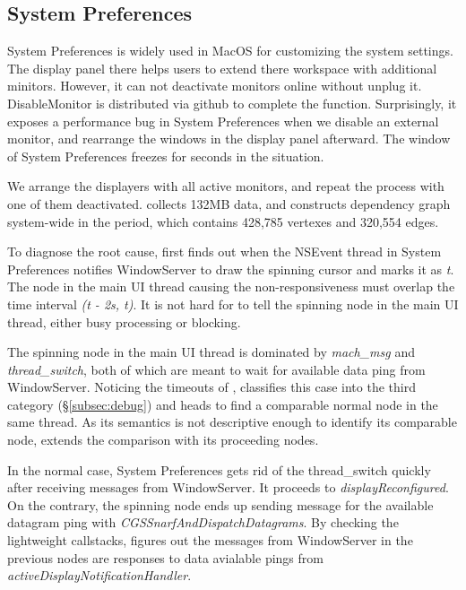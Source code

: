 \subsection{System Preferences}

System Preferences is widely used in MacOS for customizing the system settings.
The display panel there helps users to extend there workspace with additional
minitors. However, it can not deactivate monitors online without unplug it.
DisableMonitor is distributed via github to complete the function. Surprisingly,
it exposes a performance bug in System Preferences when we disable an external
monitor, and rearrange the windows in the display panel afterward. The window of
System Preferences freezes for seconds in the situation.

We arrange the displayers with all active monitors, and repeat the process with
one of them deactivated. \xxx collects 132MB data, and constructs dependency
graph system-wide in the period, which contains 428,785 vertexes and 320,554
edges.

To diagnose the root cause, \xxx first finds out when the NSEvent thread in
System Preferences notifies WindowServer to draw the spinning cursor and marks
it as \textit{t}. The node in the main UI thread causing the non-responsiveness
must overlap the time interval \textit{(t - 2s, t)}. It is not hard for
\xxx to tell the spinning node in the main UI thread, either busy processing or
blocking.

The spinning node in the main UI thread is dominated by \textit{mach\_msg} and
\textit{thread\_switch}, both of which are meant to wait for available data
ping from WindowServer. Noticing the timeouts of , \xxx
classifies this case into the third category (\S\ref{subsec:debug}) and heads
to find a comparable normal node in the same thread. As its semantics is not
descriptive enough to identify its comparable node, \xxx extends the comparison
with its proceeding nodes.

In the normal case, System Preferences gets rid of the thread\_switch
quickly after receiving messages from WindowServer. It proceeds
to \textit{displayReconfigured}. On the contrary, the spinning
node ends up sending message for the available datagram ping with
\textit{CGSSnarfAndDispatchDatagrams}. By checking the lightweight callstacks,
\xxx figures out the messages from WindowServer in the previous nodes are
responses to data avialable pings from \textit{activeDisplayNotificationHandler}.

